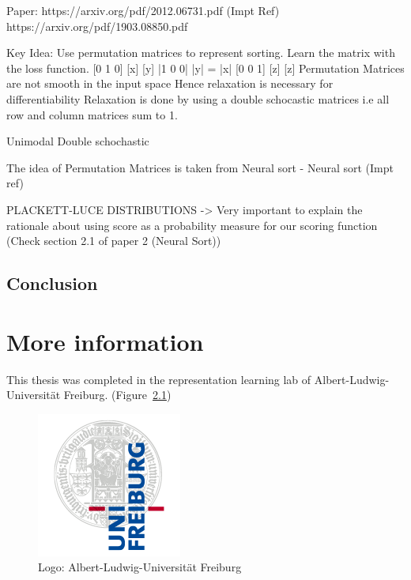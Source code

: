 \documentclass[11pt]{report}
\begin{document}
Paper: https://arxiv.org/pdf/2012.06731.pdf
       (Impt Ref) https://arxiv.org/pdf/1903.08850.pdf

Key Idea:
    Use permutation matrices to represent sorting. Learn the matrix with the loss function.
    [0 1 0] [x]    [y]
    |1 0 0| |y|  = |x|
    [0 0 1] [z]    [z]
    Permutation Matrices are not smooth in the input space Hence relaxation is necessary for differentiability
    Relaxation is done by using a double schocastic matrices i.e all row and column matrices sum to 1.

    Unimodal
    Double schochastic

The idea of Permutation Matrices is taken from Neural sort - Neural sort (Impt ref)

PLACKETT-LUCE DISTRIBUTIONS -> Very important to explain the rationale about using score as a probability
    measure for our scoring function (Check section 2.1 of paper 2 (Neural Sort))
    
\section{Conclusion}




\appendix
\chapter{More information}
This thesis was completed in the representation learning lab of Albert-Ludwig-Universität Freiburg.  (Figure~\ref{fig:UniLogo})

\begin{figure}[htb]
  \centering
    \includegraphics[scale=0.35]{images/logo}
    \caption{Logo: Albert-Ludwig-Universität Freiburg}
    \label{fig:UniLogo}
\end{figure}
\end{document}
